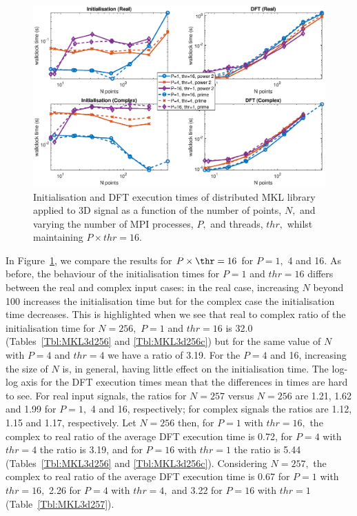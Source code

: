 \documentclass[a4paper]{article}
\begin{document}
\begin{figure}[htb]
    \centering
    \includegraphics[width=0.9\linewidth]{../results/mkl_3d_mpi_thr.eps}
  \caption{Initialisation and DFT execution times of distributed MKL library applied to 3D signal as a function of the
    number of points, $N,$ and varying the number of MPI processes, $P,$ and threads, $thr,$ whilst maintaining $P\times thr=16.$}
  \label{3DDistMKL16}
\end{figure}

In Figure~\ref{3DDistMKL16}, we compare the results for
$P\times\thr=16$ for $P=1,$ 4 and 16. As before, the behaviour of the
initialisation times for $P=1$ and $thr=16$ differs between the real
and complex input cases: in the real case, increasing $N$ beyond 100
increases the initialisation time but for the complex case the
initialisation time decreases. This is highlighted when we see that
real to complex ratio of the initialisation time for $N=256,$ $P=1$
and $thr=16$ is 32.0 (Tables~\ref{Tbl:MKL3d256} and
\ref{Tbl:MKL3d256c}) but for the same value of $N$ with $P=4$ and
$thr=4$ we have a ratio of 3.19. For the $P=4$ and 16, increasing the
size of $N$ is, in general, having little effect on the initialisation
time. The log-log axis for the DFT execution times mean that the
differences in times are hard to see. For real input signals, the
ratios for $N=257$ versus $N=256$ are 1.21, 1.62 and 1.99 for $P=1,$ 4
and 16, respectively; for complex signals the ratios are 1.12, 1.15
and 1.17, respectively. Let $N=256$ then, for $P=1$ with $thr=16,$ the
complex to real ratio of the average DFT execution time is 0.72, for
$P=4$ with $thr=4$ the ratio is 3.19, and for $P=16$ with $thr=1$ the
ratio is 5.44 (Tables~\ref{Tbl:MKL3d256} and
\ref{Tbl:MKL3d256c}). Considering $N=257,$ the complex to real ratio
of the average DFT execution time is 0.67 for $P=1$ with $thr=16,$
2.26 for $P=4$ with $thr=4,$ and 3.22 for $P=16$ with $thr=1$
(Table~\ref{Tbl:MKL3d257}).
\end{document}
